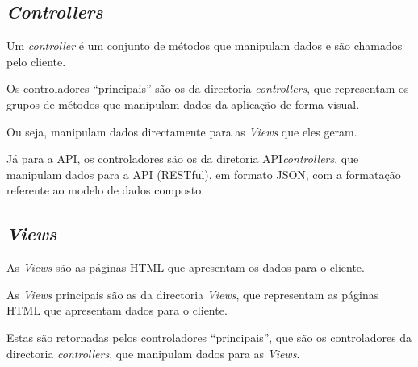\subsection{\textit{Controllers}}

Um \textit{controller} é um conjunto de métodos que manipulam dados e são chamados pelo cliente.

Os controladores ``principais'' são os da directoria \textit{\textit{controllers}}, que representam os grupos de métodos que manipulam dados da aplicação de forma visual.

Ou seja, manipulam dados directamente para as \textit{Views} que eles geram.

Já para a API, os controladores são os da diretoria API\/\textit{\textit{controllers}}, que manipulam dados para a API (RESTful), em formato JSON, com a formatação referente ao modelo de dados composto.

\subsection{\textit{Views}}

As \textit{Views} são as páginas HTML que apresentam os dados para o cliente.

As \textit{Views} principais são as da directoria \textit{Views}, que representam as páginas HTML que apresentam dados para o cliente.

Estas são retornadas pelos controladores ``principais'', que são os controladores da directoria \textit{\textit{controllers}}, que manipulam dados para as \textit{Views}.
